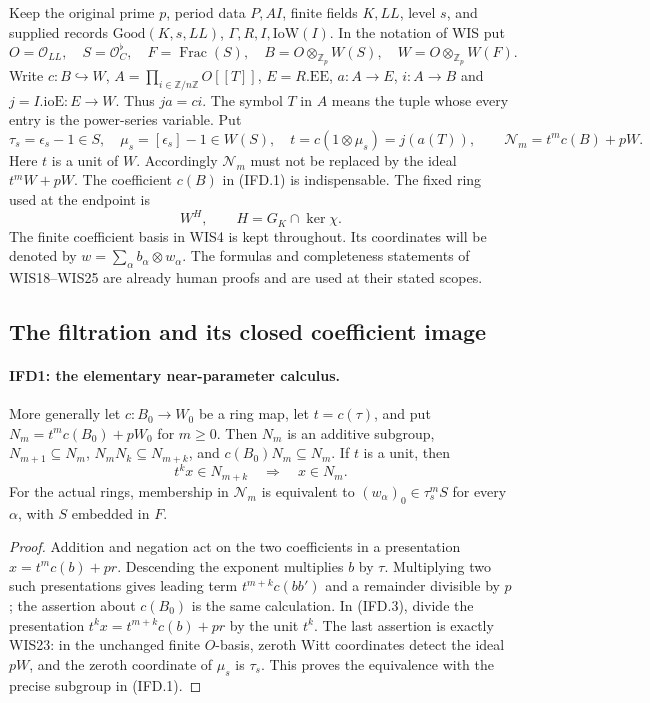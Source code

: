 \documentclass[11pt,a4paper]{article}
\numberwithin{equation}{section}
\theoremstyle{remark}\newtheorem{remark}[theorem]{Remark}
\begin{document}
Keep the original prime $p$, period data $P,AI$, finite fields $K,LL$,
level $s$, and supplied records $\mathrm{Good}(K,s,LL)$,
$\Gamma,R,I,\mathrm{IoW}(I)$. In the notation of WIS put
\[
 O=\mathcal O_{LL},\quad S=\mathcal O_C^\flat,\quad F=\operatorname{Frac}(S),
 \quad B=O\otimes_{\mathbb Z_p}W(S),\quad W=O\otimes_{\mathbb Z_p}W(F).
\]
Write $c:B\hookrightarrow W$, $A=\prod_{i\in\mathbb Z/n\mathbb Z}O[[T]]$,
$E=R.\mathrm{EE}$, $a:A\to E$, $i:A\to B$ and $j=I.\mathrm{ioE}:E\to W$.
Thus $ja=ci$. The symbol $T$ in $A$ means the tuple whose every entry
is the power-series variable. Put
\[
 \tau_s=\epsilon_s-1\in S,\quad \mu_s=[\epsilon_s]-1\in W(S),\quad
 t=c(1\otimes\mu_s)=j(a(T)),\qquad
 \mathcal N_m=t^mc(B)+pW.                                      \tag{IFD.1}
\]
Here $t$ is a unit of $W$. Accordingly $\mathcal N_m$ must not be
replaced by the ideal $t^mW+pW$. The coefficient $c(B)$ in (IFD.1)
is indispensable. The fixed ring used at the endpoint is
\[
 W^H,\qquad H=G_K\cap\ker\chi.
                                                               \tag{IFD.2}
\]
The finite coefficient basis in WIS4 is kept throughout. Its coordinates
will be denoted by $w=\sum_\alpha b_\alpha\otimes w_\alpha$.
The formulas and completeness statements of WIS18--WIS25 are already
human proofs and are used at their stated scopes.

\subsection{The filtration and its closed coefficient image}

\paragraph{IFD1: the elementary near-parameter calculus.}
\label{claim:IFD1}
More generally let $c:B_0\to W_0$ be a ring map, let
$t=c(\tau)$, and put $N_m=t^mc(B_0)+pW_0$ for $m\geq0$.
Then $N_m$ is an additive subgroup, $N_{m+1}\subseteq N_m$,
$N_mN_k\subseteq N_{m+k}$, and $c(B_0)N_m\subseteq N_m$.
If $t$ is a unit, then
\[
             t^k x\in N_{m+k}\quad\Longrightarrow\quad x\in N_m.
                                                               \tag{IFD.3}
\]
For the actual rings, membership in $\mathcal N_m$ is equivalent to
$(w_\alpha)_0\in\tau_s^m S$ for every $\alpha$, with $S$ embedded in $F$.

\begin{proof}
Addition and negation act on the two coefficients in a presentation
$x=t^mc(b)+pr$. Descending the exponent multiplies $b$ by $\tau$.
Multiplying two such presentations gives leading term
$t^{m+k}c(bb')$ and a remainder divisible by $p$; the assertion about
$c(B_0)$ is the same calculation. In (IFD.3), divide the presentation
$t^kx=t^{m+k}c(b)+pr$ by the unit $t^k$.
The last assertion is exactly WIS23: in the unchanged finite $O$-basis,
zeroth Witt coordinates detect the ideal $pW$, and the zeroth coordinate
of $\mu_s$ is $\tau_s$. This proves the equivalence with the precise
subgroup in (IFD.1).
\end{proof}
\end{document}
